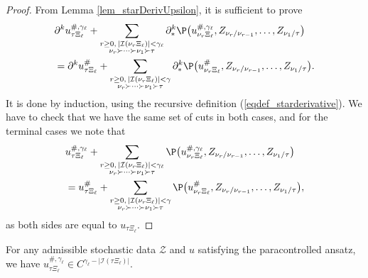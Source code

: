 \documentclass[11pt]{preprint}
\newcommand{\mcI}{\mathcal{I}}
\newcommand{\mcZ}{\mathcal{Z}}
\def\eqref#1{(\ref{#1})}
\begin{document}
	\begin{proof}
		From Lemma \ref{lem_starDerivUpsilon}, it is sufficient to prove
		\begin{align*}
		&\partial^k u_{\tau\Xi_\ell}^{\#,\gamma_\ell} + \sum_{\substack{r\geq 0, \, |\mcI(\nu_r\Xi_\ell)|<\gamma_\ell \\ \nu_r\succ\dots\succ\nu_1\succ\tau}}\partial^k_*\P\big( u_{\nu_r\Xi_\ell}^{\#,\gamma_\ell}, Z_{\nu_r/\nu_{r-1}},\dots, Z_{\nu_1/\tau}\big) 
		\\&=
		\partial^k u_{\tau\Xi_\ell}^{\#} + \sum_{\substack{r\geq 0, \, |\mcI(\nu_r\Xi_\ell)|<\gamma \\ \nu_r\succ\dots\succ\nu_1\succ\tau}}\partial^k_*\P\big( u_{\nu_r\Xi_\ell}^{\#}, Z_{\nu_r/\nu_{r-1}},\dots, Z_{\nu_1/\tau}\big).
		\end{align*}
		It is done by induction, using the recursive definition \eqref{eqdef_starderivative}. We have to check that we have the same set of cuts in both cases, and for the terminal cases we note that
		\begin{align*}
			& u_{\tau\Xi_\ell}^{\#,\gamma_\ell} + \sum_{\substack{r\geq 0, \, |\mcI(\nu_r\Xi_\ell)|<\gamma_\ell \\ \nu_r\succ\dots\succ\nu_1\succ\tau}}\P\big( u_{\nu_r\Xi_\ell}^{\#,\gamma_\ell}, Z_{\nu_r/\nu_{r-1}},\dots, Z_{\nu_1/\tau}\big) 
			\\&=
		 u_{\tau\Xi_\ell}^{\#} + \sum_{\substack{r\geq 0, \, |\mcI(\nu_r\Xi_\ell)|<\gamma \\ \nu_r\succ\dots\succ\nu_1\succ\tau}}\P\big( u_{\nu_r\Xi_\ell}^{\#}, Z_{\nu_r/\nu_{r-1}},\dots, Z_{\nu_1/\tau}\big),
		\end{align*} 
		as both sides are equal to $u_{\tau\Xi_\ell}$.
	\end{proof}	
	
	
	\begin{proposition}\label{prop_regularite_utaudash_gammaell}
		For any admissible stochastic data $\mcZ$ and $u$ satisfying the paracontrolled ansatz, we have ${u}_{\tau\Xi_\ell}^{\#,\gamma_\ell}\in C^{  \gamma_\ell-|\mcI(\tau\Xi_\ell)|   }.   $
	\end{proposition}
	
\end{document}
